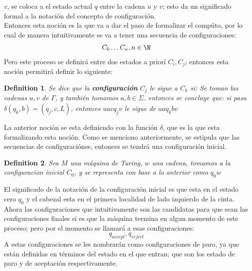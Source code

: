 \documentclass[10pt]{report}
\newtheorem{definition}{Definition}
\begin{document}
    $v$, se coloca a el estado actual $q$ entre la cadena $u$ y $v$; esto da un significado formal a la notación del concepto
    de configuración.
    \\
    \newline
    Entonces esta noción es la que va a dar el paso de formalizar el compúto, por lo cual de manera intuitivamente se va
    a tener una secuencia de configuraciones:
    \begin{equation}
        C_{0}\mathellipsis C_{n}, n\in \N
    \end{equation}
    Pero este proceso se definirá entre dos estados a priorí $C_{i},C_{j}$;
    entonces esta noción permitirá definir lo siguiente:
    \begin{definition}
        Se dice que la \textbf{configuración} $C_{j}$ le sigue a $C_{k}$ si:
        Se toman las cadenas $u,v$ de $\Gamma$, y también tomamos $a,b\in \Sigma$.
        entonces se concluye que: si pasa $\delta(q_{k},b) = (q_{j},c,L)$,
        entonces $uacq_{j}v$ le sigue de $uaq_{k}bv$

    \end{definition}
    La anterior noción se esta definiendo con la función $\delta$, que es la que esta formalizando esta noción.
    Como se menciono anteriormente, se estipula que las secuencias de configuraciónes, entonces se tendrá una configuración
    inicial.
    \begin{definition}
        Sea $M$ una máquina de Turing, $w$ una cadena, tomamos a
         la configuracion inicial $C_{0}$, y se representa con base a lo anterior como $q_{0}w$
        \end{definition}
    \newline
    El significado de la notación de la configuración inicial es que esta en
    el estado cero $q_{0}$ y el cabezal esta en el primera localidad de lado izquierdo de la cinta.
    Ahora las configuraciones que intuitivamente son las candidatas para
    que sean las configuraciones finales si es que la máquina termina en algun momento de este
    proceso; pero por el momento se llamará a esas configuraciones:\newline
    \begin{equation}
        q_{accept}, q_{reject}\label{eq:equation8}
    \end{equation}
    A estas configuraciones se les nombrarán como configuraciones de paro, ya que están definidas
    en términos del estado en el que entran; que son los estado de paro y de aceptación respectivamente.\newline
\end{document}
